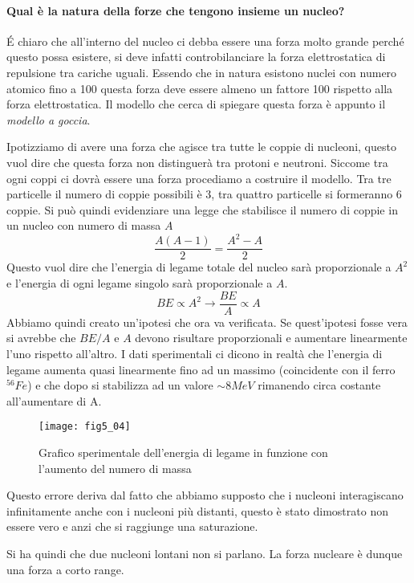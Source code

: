 \paragraph{Qual è la natura della forze che tengono insieme un nucleo?}
\'E chiaro che all'interno del nucleo ci debba essere una forza molto grande perché questo possa esistere, si deve infatti controbilanciare la forza elettrostatica di repulsione tra cariche uguali. 
Essendo che in natura esistono nuclei con numero atomico fino a 100 questa forza deve essere  almeno un fattore 100 rispetto alla forza elettrostatica.
Il modello che cerca di spiegare questa forza è appunto il \emph{modello a goccia}.

Ipotizziamo di avere una forza che agisce tra tutte le coppie di nucleoni, questo vuol dire che questa forza non distinguerà tra protoni e neutroni.
Siccome tra ogni coppi ci dovrà essere una forza procediamo a costruire il modello.
Tra tre particelle il numero di coppie possibili è 3, tra quattro particelle si formeranno 6 coppie. 
Si può quindi evidenziare una legge che stabilisce il numero di coppie in un nucleo con numero di massa $A$
\begin{equation}
\frac{A(A-1)}{2}=\frac{A^2-A}{2}
\end{equation}
Questo vuol dire che l'energia di legame totale del nucleo sarà proporzionale a $A^2$ e l'energia di ogni legame singolo sarà proporzionale a $A$.
\begin{equation}
BE\propto A^2\to \frac{BE}{A}\propto A
\end{equation}
Abbiamo quindi creato un'ipotesi che ora va verificata.
Se quest'ipotesi fosse vera si avrebbe che $BE/A$ e $A$ devono risultare proporzionali e aumentare linearmente l'uno rispetto all'altro.
I dati sperimentali ci dicono in realtà che l'energia di legame aumenta quasi linearmente fino ad un massimo (coincidente con il ferro $^{56}Fe$) e che dopo si stabilizza ad un valore $\sim 8MeV$ rimanendo circa costante all'aumentare di A.
\begin{figure}[h]
\centering
\texttt{[image: fig5\_04]}
\caption{Grafico sperimentale  dell'energia di legame in funzione con l'aumento del numero di massa}
\end{figure}

Questo errore deriva dal fatto che abbiamo supposto che i nucleoni interagiscano infinitamente anche con i nucleoni più distanti, questo è stato dimostrato non essere vero e anzi che si raggiunge una saturazione.

Si ha quindi che due nucleoni lontani non si parlano.
La forza nucleare è dunque una forza a corto range.

